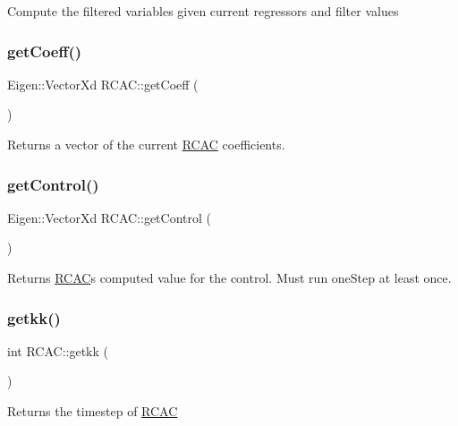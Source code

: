 Compute the filtered variables given current regressors and filter values \mbox{\label{class_r_c_a_c_a5223fc3dbd1a3b4b1577dfd83af76f7e}} 
\subsubsection{\texorpdfstring{get\+Coeff()}{getCoeff()}}
{\footnotesize\ttfamily Eigen\+::\+Vector\+Xd R\+C\+A\+C\+::get\+Coeff (\begin{DoxyParamCaption}{ }\end{DoxyParamCaption})\hspace{0.3cm}{\ttfamily [inline]}}

Returns a vector of the current \hyperlink{class_r_c_a_c}{R\+C\+AC} coefficients. \mbox{\label{class_r_c_a_c_ad93e5753d1810d7c3b2f6fbf56857a51}} 
\subsubsection{\texorpdfstring{get\+Control()}{getControl()}}
{\footnotesize\ttfamily Eigen\+::\+Vector\+Xd R\+C\+A\+C\+::get\+Control (\begin{DoxyParamCaption}{ }\end{DoxyParamCaption})\hspace{0.3cm}{\ttfamily [inline]}}

Returns \hyperlink{class_r_c_a_c}{R\+C\+AC}\textquotesingle{}s computed value for the control. Must run one\+Step at least once. \mbox{\label{class_r_c_a_c_a4e710eaf32fac967dc76a8d851a51211}} 
\subsubsection{\texorpdfstring{getkk()}{getkk()}}
{\footnotesize\ttfamily int R\+C\+A\+C\+::getkk (\begin{DoxyParamCaption}{ }\end{DoxyParamCaption})\hspace{0.3cm}{\ttfamily [inline]}}

Returns the timestep of \hyperlink{class_r_c_a_c}{R\+C\+AC} \mbox{\label{class_r_c_a_c_ae854b722c35cb1d8506ddacf6a89f795}} 
